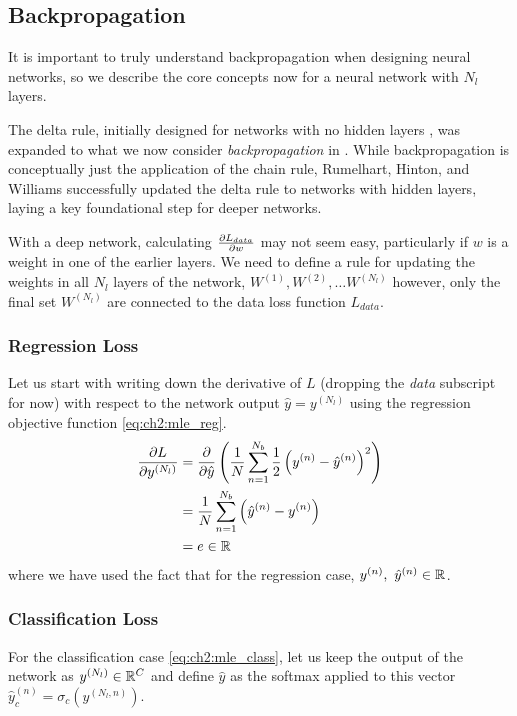 \subsection{Backpropagation}
It is important to truly understand backpropagation when designing neural
networks, so we describe the core concepts now for a neural network with
$N_l$ layers.

The delta rule, initially designed for networks with no hidden layers
\cite{widrow_neurocomputing:_1988}, was expanded to what we now consider
\emph{backpropagation} in \cite{rumelhart_parallel_1986}. While backpropagation
is conceptually just the application of the chain rule, Rumelhart, Hinton, and
Williams successfully updated the delta rule to networks with hidden layers,
laying a key foundational step for deeper networks.

With a deep network, calculating $\dydx{L_{data}}{w}$ may not seem easy,
particularly if $w$ is a weight in one of the earlier layers. We need
to define a rule for updating the weights in all $N_l$ layers of the network,
$W^{(1)}, W^{(2)}, \ldots W^{(N_l)}$ however, only the final set $W^{(N_l)}$ are
connected to the data loss function $L_{data}$.

\subsubsection{Regression Loss}
Let us start with writing down the derivative of $L$ (dropping the \emph{data}
subscript for now) with respect to the network
output $\hat{y} = y^{(N_l)}$ using the regression objective function \eqref{eq:ch2:mle_reg}.
\begin{align}
  \dydx{L}{y^{(N_l)}} &= \dydx{}{\hat{y}} \left( \frac{1}{N}\sum_{n=1}^{N_b}\frac{1}{2} \left(y^{(n)} - \hat{y}^{(n)}\right)^2\right) \\
                    &= \frac{1}{N}\sum_{n=1}^{N_b} \left(\hat{y}^{(n)} - y^{(n)} \right) \\
                    &= e \in \reals \label{eq:ch2:reg_b1}
\end{align}
where we have used the fact that for the regression case, $y^{(n)},\ \hat{y}^{(n)}
\in \reals$.

\subsubsection{Classification Loss}
For the classification case \eqref{eq:ch2:mle_class}, let us keep the output of
the network as $y^{(N_l)} \in \reals[C]$ and define $\hat{y}$ as the
softmax applied to this vector $\hat{y}^{(n)}_c = \sigma_c\left(y^{(N_l, n)}\right)$.

